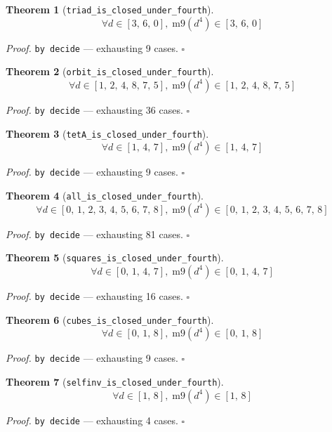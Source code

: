 \documentclass[11pt]{article}
\newtheorem{theorem}{Theorem}[section]
\begin{document}
\begin{theorem}[\texttt{triad\_is\_closed\_under\_fourth}]
\[ \forall d \in [3,\,6,\,0],\; \mathrm{m9}\mathopen{}\left(d^{4}\right) \in [3,\,6,\,0] \]
\end{theorem}
\noindent\emph{Proof.} \texttt{by decide} --- exhausting 9 cases. \hfill$\square$

\begin{theorem}[\texttt{orbit\_is\_closed\_under\_fourth}]
\[ \forall d \in [1,\,2,\,4,\,8,\,7,\,5],\; \mathrm{m9}\mathopen{}\left(d^{4}\right) \in [1,\,2,\,4,\,8,\,7,\,5] \]
\end{theorem}
\noindent\emph{Proof.} \texttt{by decide} --- exhausting 36 cases. \hfill$\square$

\begin{theorem}[\texttt{tetA\_is\_closed\_under\_fourth}]
\[ \forall d \in [1,\,4,\,7],\; \mathrm{m9}\mathopen{}\left(d^{4}\right) \in [1,\,4,\,7] \]
\end{theorem}
\noindent\emph{Proof.} \texttt{by decide} --- exhausting 9 cases. \hfill$\square$

\begin{theorem}[\texttt{all\_is\_closed\_under\_fourth}]
\[ \forall d \in [0,\,1,\,2,\,3,\,4,\,5,\,6,\,7,\,8],\; \mathrm{m9}\mathopen{}\left(d^{4}\right) \in [0,\,1,\,2,\,3,\,4,\,5,\,6,\,7,\,8] \]
\end{theorem}
\noindent\emph{Proof.} \texttt{by decide} --- exhausting 81 cases. \hfill$\square$

\begin{theorem}[\texttt{squares\_is\_closed\_under\_fourth}]
\[ \forall d \in [0,\,1,\,4,\,7],\; \mathrm{m9}\mathopen{}\left(d^{4}\right) \in [0,\,1,\,4,\,7] \]
\end{theorem}
\noindent\emph{Proof.} \texttt{by decide} --- exhausting 16 cases. \hfill$\square$

\begin{theorem}[\texttt{cubes\_is\_closed\_under\_fourth}]
\[ \forall d \in [0,\,1,\,8],\; \mathrm{m9}\mathopen{}\left(d^{4}\right) \in [0,\,1,\,8] \]
\end{theorem}
\noindent\emph{Proof.} \texttt{by decide} --- exhausting 9 cases. \hfill$\square$

\begin{theorem}[\texttt{selfinv\_is\_closed\_under\_fourth}]
\[ \forall d \in [1,\,8],\; \mathrm{m9}\mathopen{}\left(d^{4}\right) \in [1,\,8] \]
\end{theorem}
\noindent\emph{Proof.} \texttt{by decide} --- exhausting 4 cases. \hfill$\square$
\end{document}
